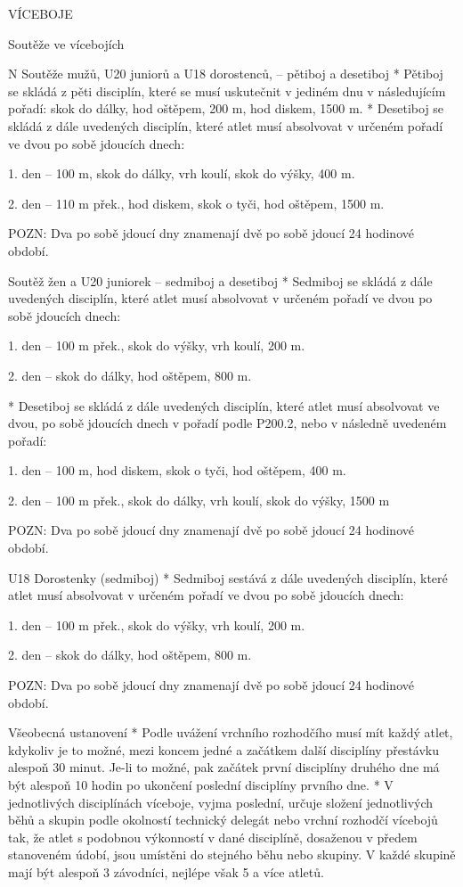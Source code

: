 \sec VÍCEBOJE

\secc Soutěže ve vícebojích

\begitems \style N
Soutěže mužů, U20 juniorů a U18 dorostenců, -- pětiboj a desetiboj
* Pětiboj se skládá z pěti disciplín, které se musí uskutečnit v jediném dnu v následujícím pořadí: skok do dálky, hod oštěpem, 200 m, hod diskem, 1500 m.
* Desetiboj se skládá z dále uvedených disciplín, které atlet musí absolvovat v určeném pořadí ve dvou po sobě jdoucích dnech:

1. den -- 100 m, skok do dálky, vrh koulí, skok do výšky, 400 m.

2. den -- 110 m přek., hod diskem, skok o tyči, hod oštěpem, 1500 m.

POZN: Dva po sobě jdoucí dny znamenají dvě po sobě jdoucí 24 hodinové období.

Soutěž žen a U20 juniorek – sedmiboj a desetiboj
* Sedmiboj se skládá z dále uvedených disciplín, které atlet musí absolvovat v určeném pořadí ve dvou po sobě jdoucích dnech:

1. den -- 100 m přek., skok do výšky, vrh koulí, 200 m.

2. den -- skok do dálky, hod oštěpem, 800 m.

* Desetiboj se skládá z dále uvedených disciplín, které atlet musí absolvovat ve dvou, po sobě jdoucích dnech v pořadí podle P200.2, nebo v následně uvedeném pořadí:

1. den -- 100 m, hod diskem, skok o tyči, hod oštěpem, 400 m.

2. den -- 100 m přek., skok do dálky, vrh koulí, skok do výšky, 1500 m

POZN: Dva po sobě jdoucí dny znamenají dvě po sobě jdoucí 24 hodinové období.

U18 Dorostenky (sedmiboj)
* Sedmiboj sestává z dále uvedených disciplín, které atlet musí absolvovat v určeném pořadí ve dvou po sobě jdoucích dnech:

1. den -- 100 m přek., skok do výšky, vrh koulí, 200 m.

2. den -- skok do dálky, hod oštěpem, 800 m.

POZN: Dva po sobě jdoucí dny znamenají dvě po sobě jdoucí 24 hodinové období.

Všeobecná ustanovení
* Podle uvážení vrchního rozhodčího musí mít každý atlet, kdykoliv je to možné, mezi koncem jedné a začátkem další disciplíny přestávku alespoň 30 minut. Je-li to možné, pak začátek první disciplíny druhého dne má být alespoň 10 hodin po ukončení poslední disciplíny prvního dne.
* V jednotlivých disciplínách víceboje, vyjma poslední, určuje složení jednotlivých běhů a skupin podle okolností technický delegát nebo vrchní rozhodčí vícebojů tak, že atlet s podobnou výkonností v dané disciplíně, dosaženou v předem stanoveném údobí, jsou umístěni do stejného běhu nebo skupiny. V každé skupině mají být alespoň 3 závodníci, nejlépe však 5 a více atletů.

